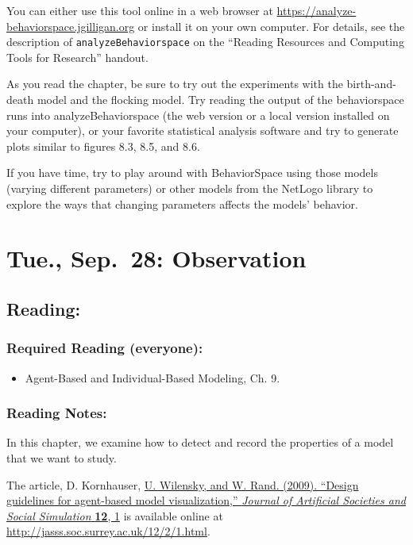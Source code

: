 \documentclass[
]{article}
\providecommand{\tightlist}{%
  \setlength{\itemsep}{0pt}\setlength{\parskip}{0pt}}
\begin{document}
You can either use this tool online in a web browser at
\url{https://analyze-behaviorspace.jgilligan.org} or install it on your
own computer. For details, see the description of
\texttt{analyzeBehaviorspace} on the ``Reading Resources and Computing
Tools for Research'' handout.

As you read the chapter, be sure to try out the experiments with the
birth-and-death model and the flocking model. Try reading the output of
the behaviorspace runs into analyzeBehaviorspace (the web version or a
local version installed on your computer), or your favorite statistical
analysis software and try to generate plots similar to figures 8.3, 8.5,
and 8.6.

If you have time, try to play around with BehaviorSpace using those
models (varying different parameters) or other models from the NetLogo
library to explore the ways that changing parameters affects the models'
behavior.

\hypertarget{tue.-sep.-28-observation}{%
\section{Tue., Sep.~28: Observation}\label{tue.-sep.-28-observation}}

\hypertarget{reading-9}{%
\subsection{Reading:}\label{reading-9}}

\hypertarget{required-reading-everyone-8}{%
\subsubsection{Required Reading
(everyone):}\label{required-reading-everyone-8}}

\begin{itemize}
\tightlist
\item
  Agent-Based and Individual-Based Modeling, Ch. 9.
\end{itemize}

\hypertarget{reading-notes-8}{%
\subsubsection{Reading Notes:}\label{reading-notes-8}}

In this chapter, we examine how to detect and record the properties of a
model that we want to study.

The article, D. Kornhauser,
\href{http://jasss.soc.surrey.ac.uk/12/2/1.html}{U. Wilensky, and W.
Rand. (2009). ``Design guidelines for agent-based model visualization,''
\emph{Journal of Artificial Societies and Social Simulation}
\textbf{12}, 1} is available online at
\url{http://jasss.soc.surrey.ac.uk/12/2/1.html}.
\end{document}
